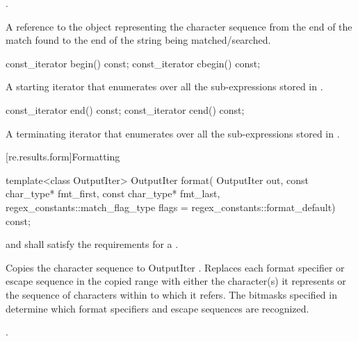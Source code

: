 \begin{itemdescr}
\pnum
\requires {}.

\pnum
\returns A reference to the  object representing the
character sequence from the end of the match found to the end of the
string being matched/searched.
\end{itemdescr}

%
\begin{itemdecl}
const_iterator begin() const;
const_iterator cbegin() const;
\end{itemdecl}

\begin{itemdescr}
\pnum\returns A starting iterator that enumerates over all the
sub-expressions stored in .
\end{itemdescr}

%
\begin{itemdecl}
const_iterator end() const;
const_iterator cend() const;
\end{itemdecl}

\begin{itemdescr}
\pnum\returns A terminating iterator that enumerates over all the
sub-expressions stored in .
\end{itemdescr}

[re.results.form]{Formatting}

%
\begin{itemdecl}
template<class OutputIter>
  OutputIter format(
      OutputIter out,
      const char_type* fmt_first, const char_type* fmt_last,
      regex_constants::match_flag_type flags = regex_constants::format_default) const;
\end{itemdecl}

\begin{itemdescr}
\pnum
\requires {} and  shall satisfy the requirements for a
.

\pnum
\effects Copies the character sequence  to
OutputIter .  Replaces each format specifier or escape
sequence in the copied range with either the character(s) it represents or
the sequence of characters within  to which it refers.
The bitmasks specified in  determine which format
specifiers and escape sequences are recognized.

\pnum
\returns {}.
\end{itemdescr}

